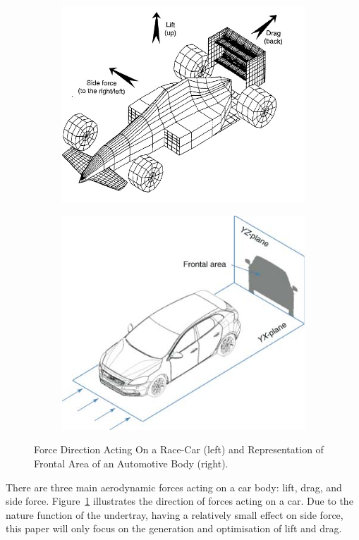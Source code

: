 \begin{figure}[!h]
\begin{center}
%    
  \begin{subfigure}[b]{0.4\textwidth}
    \includegraphics[scale=0.4]{Figures/race_car_forces.jpg}
  \end{subfigure}
  \begin{subfigure}[b]{0.4\textwidth}
    \includegraphics[scale=0.8]{Figures/frontal_area.jpg}
  \end{subfigure}
%  
  \caption{Force Direction Acting On a Race-Car (left) and Representation of Frontal Area of an Automotive Body (right)\cite{Sebben2014FundamentalsDesign}.}
    \label{fig:Force direction and frontal area}
\end{center}
\end{figure}
\noindent There are three main aerodynamic forces acting on a car body: lift, drag, and side force. Figure~\ref{fig:Force direction and frontal area} illustrates the direction of forces acting on a car. Due to the nature function of the undertray, having a relatively small effect on side force, this paper will only focus on the generation and optimisation of lift and drag.


